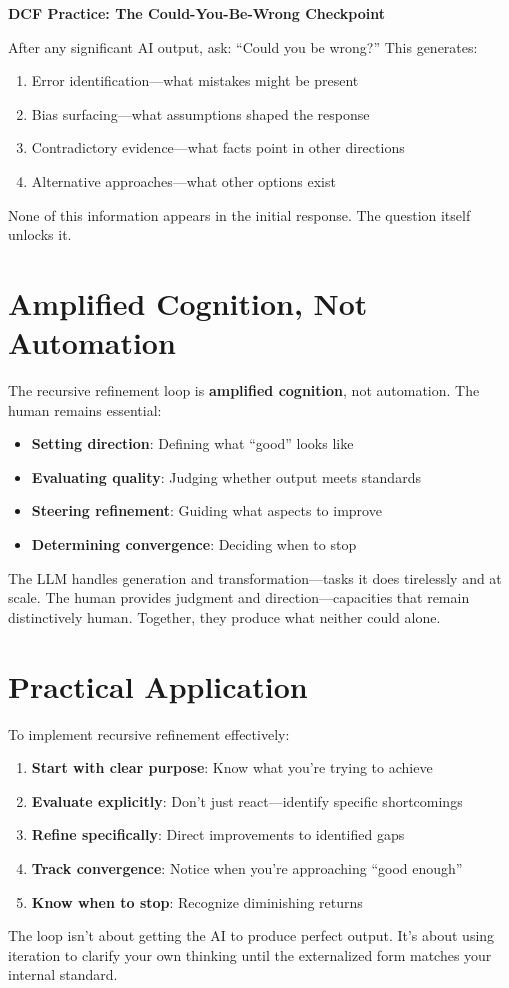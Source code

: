 \begin{quotebox}
\textbf{DCF Practice: The Could-You-Be-Wrong Checkpoint}

After any significant AI output, ask: ``Could you be wrong?'' This generates:
\begin{enumerate}
    \item Error identification---what mistakes might be present
    \item Bias surfacing---what assumptions shaped the response
    \item Contradictory evidence---what facts point in other directions
    \item Alternative approaches---what other options exist
\end{enumerate}
None of this information appears in the initial response. The question itself unlocks it.
\end{quotebox}

\section{Amplified Cognition, Not Automation}

The recursive refinement loop is \textbf{amplified cognition}, not automation. The human remains essential:

\begin{itemize}
    \item \textbf{Setting direction}: Defining what ``good'' looks like
    \item \textbf{Evaluating quality}: Judging whether output meets standards
    \item \textbf{Steering refinement}: Guiding what aspects to improve
    \item \textbf{Determining convergence}: Deciding when to stop
\end{itemize}

The LLM handles generation and transformation---tasks it does tirelessly and at scale. The human provides judgment and direction---capacities that remain distinctively human. Together, they produce what neither could alone.

\section{Practical Application}

To implement recursive refinement effectively:

\begin{enumerate}
    \item \textbf{Start with clear purpose}: Know what you're trying to achieve
    \item \textbf{Evaluate explicitly}: Don't just react---identify specific shortcomings
    \item \textbf{Refine specifically}: Direct improvements to identified gaps
    \item \textbf{Track convergence}: Notice when you're approaching ``good enough''
    \item \textbf{Know when to stop}: Recognize diminishing returns
\end{enumerate}

The loop isn't about getting the AI to produce perfect output. It's about using iteration to clarify your own thinking until the externalized form matches your internal standard.
